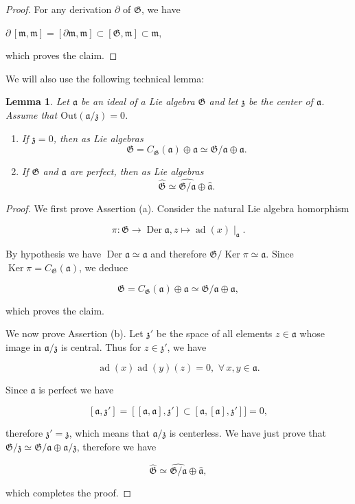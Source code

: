 \documentclass[11pt, letterpaper, reqno]{amsart}
\newtheorem{lemma}[theorem]{Lemma}
\theoremstyle{definition}
\newcommand{\ad}{\operatorname{ad}}
\newcommand{\Der}{\operatorname{Der}}
\newcommand{\fa}{\mathfrak{a}}
\newcommand{\fm}{\mathfrak{m}}
\newcommand{\fz}{\mathfrak{z}}
\newcommand{\fG}{\mathfrak{G}}
\newcommand{\Ker}{\operatorname{Ker}}
\newcommand{\Out}{\mathrm{Out}}
\begin{document}
\begin{proof} For any derivation $\partial$
of $\fG$, we have

\centerline{
$\partial \,[\fm,\fm]=
[\partial\fm,\fm]\subset [\fG,\fm]\subset \fm,$}

\noindent which proves the claim.
\end{proof}

We will also use the following technical lemma:

\begin{lemma}\label{centralizer} Let $\fa$ be an ideal of a Lie algebra $\fG$
and  let $\fz$ be the center of $\fa$. Assume that
$\Out(\fa/\fz)=0$.
\begin{enumerate}
\item[(a)] If $\fz=0$, then as  Lie algebras
$$\fG= C_\fG(\fa)\oplus \fa\simeq  \fG/\fa\oplus \fa.$$
\item[(b)] If $\fG$ and $\fa$ are perfect, then as Lie algebras
$$\widehat{\fG}\simeq \widehat{\fG/\fa}\oplus \widehat{\fa}.$$
\end{enumerate}
\end{lemma}

\begin{proof} We first prove Assertion (a). Consider  the natural Lie algebra homorphism 

$$\pi:\fG\to\Der\fa ,  z\mapsto \ad(x)\mid_\fa.$$

\noindent By hypothesis we have $\Der\fa\simeq \fa$
and therefore $\fG/\Ker\pi\simeq \fa$. Since 
$\Ker\pi=C_\fG(\fa)$, we deduce

$$\fG= C_\fG(\fa)\oplus \fa\simeq  \fG/\fa\oplus \fa,$$

\noindent which proves the claim.

\medskip
We now prove Assertion (b). Let $\fz'$ be the space of all
elements $z\in \fa$ whose image in $\fa/\fz$ is central. Thus for
$z\in\fz'$, we have

$$\ad(x)\ad(y)(z)=0,\,\,\forall\, x,y\in\fa.$$

Since $\fa$ is perfect we have

$$[\fa,\fz']=[[\fa,\fa],\fz']\subset [\fa,[\fa],\fz']]=0,$$

\noindent therefore $\fz'=\fz$, which means that $\fa/\fz$ is centerless. We have just prove that
$\fG/\fz\simeq \fG/\fa \oplus \fa/\fz$, therefore we have

$$\widehat{\fG}\simeq \widehat{\fG/\fa}\oplus \widehat{\fa},$$

\noindent which completes the proof.
\end{proof}
\end{document}
